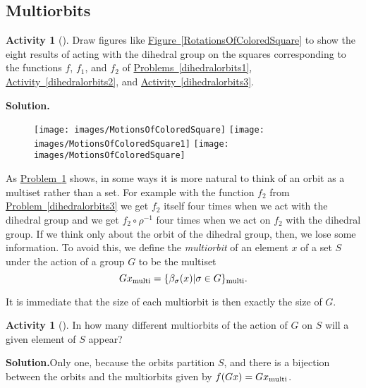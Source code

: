\documentclass[10pt,]{book}
\theoremstyle{plain}
\theoremstyle{definition}
\newtheorem{activity}[project]{Activity}
\numberwithin{equation}{chapter}
\begin{document}
\subsection[{Multiorbits}]{Multiorbits}\label{subsection-66}
\begin{activity}[]\label{multiorbits1}
Draw figures like \hyperref[RotationsOfColoredSquare]{Figure~\ref{RotationsOfColoredSquare}} to show the eight results of acting with the dihedral group on the squares corresponding to the functions \(f\), \(f_1\), and \(f_2\) of \hyperref[dihedralorbits1]{Problems~\ref{dihedralorbits1}}, \hyperref[dihedralorbits2]{Activity~\ref{dihedralorbits2}}, and \hyperref[dihedralorbits3]{Activity~\ref{dihedralorbits3}}.%
\par\medskip\noindent%
\textbf{Solution.}\quad \leavevmode%
\begin{figure}
\centering
\texttt{[image: images/MotionsOfColoredSquare]}
\texttt{[image: images/MotionsOfColoredSquare1]}
\texttt{[image: images/MotionsOfColoredSquare]}
\end{figure}
\end{activity}
As \hyperref[multiorbits1]{Problem~\ref{multiorbits1}} shows, in some ways it is more natural to think of an orbit as a multiset rather than a set. For example with the function \(f_2\) from \hyperref[dihedralorbits3]{Problem~\ref{dihedralorbits3}} we get \(f_2\) itself four times when we act with the dihedral group and we get \(f_2\circ\rho^{-1}\) four times when we act on \(f_2\) with the dihedral group. If we think only about the orbit of the dihedral group, then, we lose some information. To avoid this, we define the \emph{multiorbit} of an element \(x\) of a set \(S\) under the action of a group \(G\) to be the multiset%
\begin{equation*}
Gx_{\mbox{\scriptsize multi} } = \{\beta_{\sigma}(x)|\sigma \in
G\}_{\mbox{\scriptsize multi} }.
\end{equation*}
%
\par
It is immediate that the size of each multiorbit is then exactly the size of \(G\).%
\begin{activity}[]\label{NumberContainingx}
In how many different multiorbits of the action of \(G\) on \(S\) will a given element of \(S\) appear?%
\par\medskip\noindent%
\textbf{Solution.}\quad Only one, because the orbits partition \(S\), and there is a bijection between the orbits and the multiorbits given by \(f(Gx) =
Gx_{\mbox{\scriptsize multi} }\).%
\end{activity}
\end{document}
